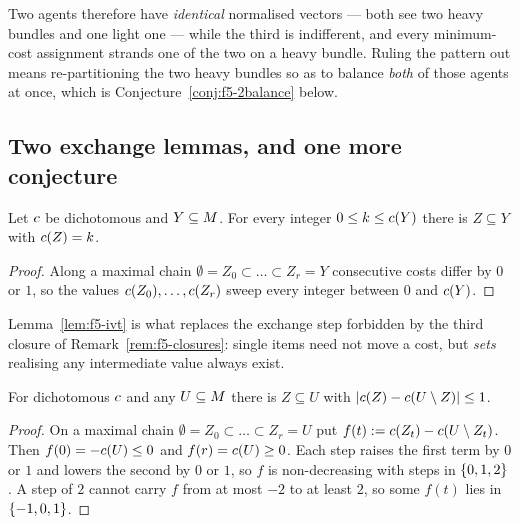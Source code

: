 Two agents therefore have \emph{identical} normalised vectors --- both see two
heavy bundles and one light one --- while the third is indifferent, and every
minimum-cost assignment strands one of the two on a heavy bundle. Ruling the
pattern out means re-partitioning the two heavy bundles so as to balance
\emph{both} of those agents at once, which is Conjecture~\ref{conj:f5-2balance}
below.

\subsection{Two exchange lemmas, and one more conjecture}
\label{sec:f5-exchange}

\begin{lemma}
\label{lem:f5-ivt}
Let $c$ be dichotomous and $Y \subseteq M$. For every integer
$0 \le k \le c(Y)$ there is $Z \subseteq Y$ with $c(Z) = k$.
\end{lemma}

\begin{proof}
Along a maximal chain $\emptyset = Z_0 \subset \dots \subset Z_r = Y$ consecutive
costs differ by $0$ or $1$, so the values $c(Z_0), \dots, c(Z_r)$ sweep
every integer between $0$ and $c(Y)$.
\end{proof}

Lemma~\ref{lem:f5-ivt} is what replaces the exchange step forbidden by the third
closure of Remark~\ref{rem:f5-closures}: single items need not move a cost, but
\emph{sets} realising any intermediate value always exist.

\begin{lemma}
\label{lem:f5-balance1}
For dichotomous $c$ and any $U \subseteq M$ there is $Z \subseteq U$
with $\left\lvert c(Z) - c(U \setminus Z)\right\rvert \le 1$.
\end{lemma}

\begin{proof}
On a maximal chain $\emptyset = Z_0 \subset \dots \subset Z_r = U$ put
$f(t) := c(Z_t) - c(U \setminus Z_t)$. Then $f(0) = -c(U) \le 0$ and
$f(r) = c(U) \ge 0$. Each step raises the first term by $0$ or $1$ and
lowers the second by $0$ or $1$, so $f$ is non-decreasing with steps in
$\left\{0,1,2\right\}$. A step of $2$ cannot carry $f$ from at most $-2$ to at least $2$,
so some $f(t)$ lies in $\left\{-1,0,1\right\}$.
\end{proof}

